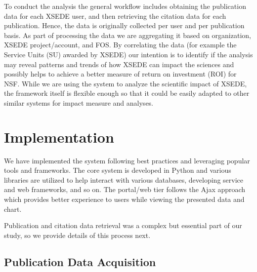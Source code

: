 \documentclass{sig-alternate}
\begin{document}
To conduct the analysis the general workflow includes obtaining the publication data for each XSEDE user, and then retrieving the citation data for each publication. Hence, the data is originally collected per user and per publication basis. As part of processing the data we are aggregating it based on organization, XSEDE project/account, and FOS. By correlating the data (for example the Service Units (SU) awarded by XSEDE) our intention is to identify if the analysis may reveal patterns and trends of how XSEDE can impact the sciences and possibly helps to achieve a better measure of return on investment (ROI) for NSF.  While we are using the system to analyze the scientific impact of XSEDE, the framework itself is flexible enough so that it could be easily adapted to other similar systems for impact measure and analyses.  \section{Implementation} \label{S:implementation} We have implemented the system following best practices and leveraging popular tools and frameworks. The core system is developed in Python and various libraries are utilized to help interact with various databases, developing service and web frameworks, and so on. The portal/web tier follows the Ajax approach which provides better experience to users while viewing the presented data and chart.

Publication and citation data retrieval was a complex but essential part of our study, so we provide details of this process next.
  
\subsection{Publication Data Acquisition} 
 
\end{document}
